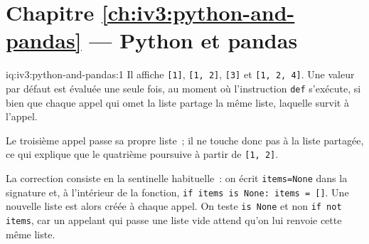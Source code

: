 

\section*{Chapitre \ref{ch:iv3:python-and-pandas} --- Python et pandas}

\begin{solution}{iq:iv3:python-and-pandas:1}
Il affiche \texttt{[1]}, \texttt{[1, 2]}, \texttt{[3]} et \texttt{[1, 2, 4]}. Une valeur par défaut est évaluée une seule fois, au moment où l'instruction \texttt{def} s'exécute, si bien que chaque appel qui omet la liste partage la même liste, laquelle survit à l'appel.

Le troisième appel passe sa propre liste~; il ne touche donc pas à la liste partagée, ce qui explique que le quatrième poursuive à partir de \texttt{[1, 2]}.

La correction consiste en la sentinelle habituelle~: on écrit \texttt{items=None} dans la signature et, à l'intérieur de la fonction, \texttt{if items is None: items = []}. Une nouvelle liste est alors créée à chaque appel. On teste \texttt{is None} et non \texttt{if not items}, car un appelant qui passe une liste vide attend qu'on lui renvoie cette même liste.

\end{solution}

